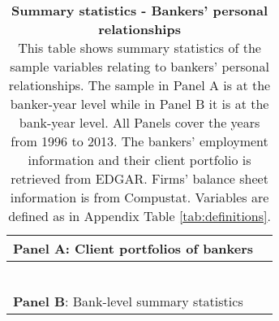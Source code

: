 

\singlespacing	


	
\begin{table}[H] \begin{center} 
		\caption{\textbf{Summary statistics - Bankers’ personal relationships} \\ This table shows summary statistics of the sample variables relating to bankers' personal relationships. The sample in Panel A is at the banker-year level while in Panel B it is at the bank-year  level. All Panels cover the years from 1996 to 2013. The bankers' employment information and their client portfolio is retrieved from EDGAR. Firms' balance sheet information is from Compustat. Variables are defined as in Appendix Table \ref{tab:definitions}. }
		\label{tab:sumstat} 
	
	\begin{threeparttable} 
	\begin{tabular*}{\hsize} {@{\hskip\tabcolsep\extracolsep\fill}l*{7}{c}}
	 	\multicolumn{7}{l}{\textbf{Panel A}: Client portfolios of bankers} \\
		\toprule
		 	
		\bottomrule \\ ~ \\ 
	
	 	 \multicolumn{7}{l}{\textbf{Panel B}: Bank-level summary statistics} \\
			\toprule 
		  
		 		\bottomrule
	\end{tabular*} 	\end{threeparttable}  \end{center} \end{table}
\newpage

